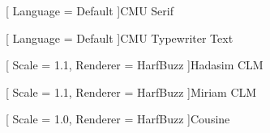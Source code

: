 \usepackage[
    bidi = basic,
    greek,
    english
]{babel}


[
    Language    = Default
]{CMU Serif}

[
    Language    = Default
]{CMU Typewriter Text}


[
    Scale       = 1.1,
    Renderer    = HarfBuzz
]{Hadasim CLM}

[
    Scale       = 1.1,
    Renderer    = HarfBuzz
]{Miriam CLM}

[
    Scale       = 1.0,
    Renderer    = HarfBuzz
]{Cousine}




\usepackage{yfonts}


\usepackage{relsize}


